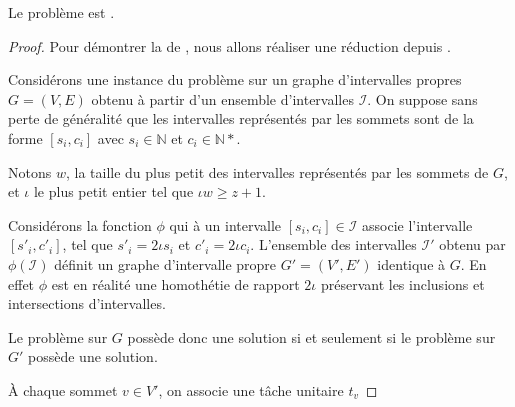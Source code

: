 \documentclass[a4paper,11pt]{thesis}
\begin{document}
\begin{nthrm}
    Le problème \unitfischedpi est \npc.
\end{nthrm}

\begin{proof}
    Pour démontrer la \npcude de \unitfischedpi, nous allons réaliser une réduction depuis
    \precolor.

    Considérons une instance du problème \precolor sur un graphe d'intervalles propres $G = (V, E)$
    obtenu à partir d'un ensemble d'intervalles $\mathcal{I}$.  On suppose sans perte de généralité
    que les intervalles représentés par les sommets sont de la forme $[s_i, c_i]$ avec $s_i \in
    \mathbb{N}$ et $c_i \in \mathbb{N}*$.

    Notons $w$, la taille du plus petit des intervalles représentés par les sommets de $G$, et
    $\iota$ le plus petit entier tel que $\iota w \geq z + 1$.

    Considérons la fonction $\phi$ qui à un intervalle $[s_i, c_i] \in \mathcal{I}$ associe
    l'intervalle $[s'_i, c'_i]$, tel que $s'_i = 2 \iota s_i$ et $c'_i = 2 \iota
    c_i$. L'ensemble des intervalles $\mathcal{I}'$ obtenu par $\phi(\mathcal{I})$ définit un graphe
    d'intervalle propre $G' = (V', E')$ identique à $G$. En effet $\phi$ est en réalité une
    homothétie de rapport $2 \iota$ préservant les inclusions et intersections d'intervalles.

    Le problème \precolor sur $G$ possède donc une solution si et seulement si le problème \precolor
    sur $G'$ possède une solution.

    À chaque sommet $v \in V'$, on associe une tâche unitaire $t_v$
    
\end{proof}



\appendix


\end{document}
